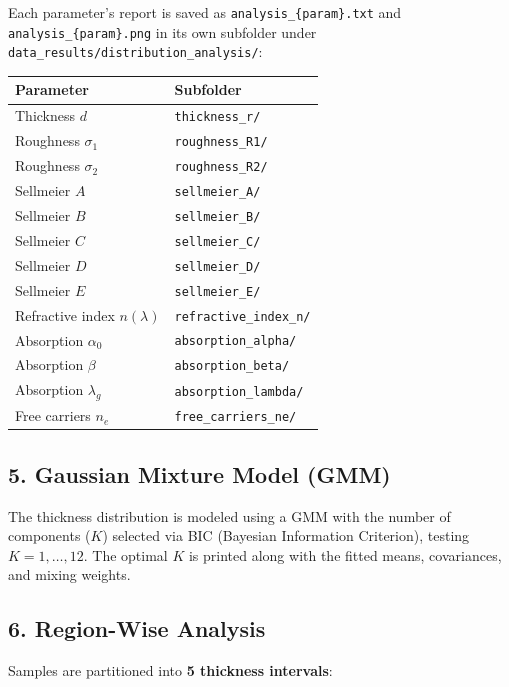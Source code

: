 \documentclass[11pt,a4paper]{article}
\begin{document}
Each parameter's report is saved as {\tt analysis\_\{param\}.txt} and {\tt analysis\_\{param\}.png} in its own subfolder under {\tt data\_results/distribution\_analysis/}:

\begin{table}[htbp]
\centering
\small
\begin{tabular}{ll}
\toprule
\textbf{Parameter} & \textbf{Subfolder} \\
\midrule
Thickness $d$               & {\tt thickness\_r/} \\
Roughness $\sigma_1$        & {\tt roughness\_R1/} \\
Roughness $\sigma_2$        & {\tt roughness\_R2/} \\
Sellmeier $A$               & {\tt sellmeier\_A/} \\
Sellmeier $B$               & {\tt sellmeier\_B/} \\
Sellmeier $C$               & {\tt sellmeier\_C/} \\
Sellmeier $D$               & {\tt sellmeier\_D/} \\
Sellmeier $E$               & {\tt sellmeier\_E/} \\
Refractive index $n(\lambda)$ & {\tt refractive\_index\_n/} \\
Absorption $\alpha_0$       & {\tt absorption\_alpha/} \\
Absorption $\beta$          & {\tt absorption\_beta/} \\
Absorption $\lambda_g$      & {\tt absorption\_lambda/} \\
Free carriers $n_e$         & {\tt free\_carriers\_ne/} \\
\bottomrule
\end{tabular}
\end{table}

\subsection{5. Gaussian Mixture Model (GMM)}
The thickness distribution is modeled using a GMM with the number of components ($K$) selected via BIC (Bayesian Information Criterion), testing $K = 1, \dots, 12$. The optimal $K$ is printed along with the fitted means, covariances, and mixing weights.

\subsection{6. Region-Wise Analysis}
Samples are partitioned into \textbf{5 thickness intervals}:
\end{document}
